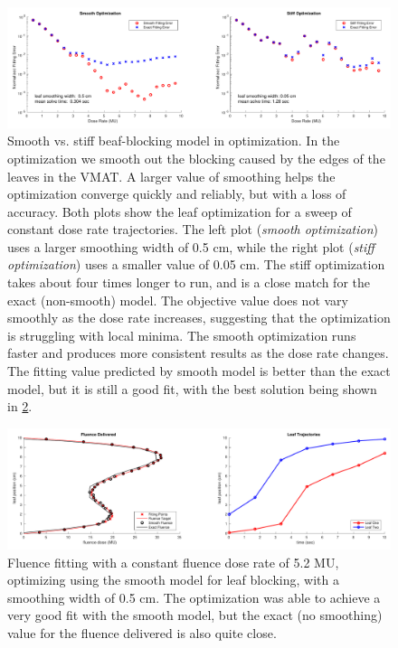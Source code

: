 \begin{figure}
  \centering
  \includegraphics[width=\textwidth]{fig/smoothVsStiffOptimization.pdf}
  \caption{Smooth vs. stiff beaf-blocking model in optimization.
      In the optimization we smooth out the blocking caused by the edges of the leaves in the VMAT.
      A larger value of smoothing helps the optimization converge quickly and reliably, but with a
      loss of accuracy. Both plots show the leaf optimization for a sweep of constant dose rate
      trajectories. The left plot (\textit{smooth optimization}) uses a larger smoothing width of 0.5 cm,
      while the right plot (\textit{stiff optimization}) uses a smaller value of 0.05 cm.
      The stiff optimization takes about four times longer to run, and is a close match for the
      exact (non-smooth) model. The objective value does not vary smoothly as the dose rate
      increases, suggesting that the optimization is struggling with local minima.
      The smooth optimization runs faster and produces more consistent results as the dose rate changes.
      The fitting value predicted by smooth model is better than the exact model, but it is still
      a good fit, with the best solution being shown in \ref{fig:fluenceMapSmoothingExample}.
  }
  \label{fig:smoothVsStiffOptimization}
\end{figure}




\begin{figure}
  \centering
  \includegraphics[width=\textwidth]{fig/fluenceMapSmoothingExample.pdf}
  \caption{Fluence fitting with a constant fluence dose rate of 5.2 MU,
      optimizing using the smooth model for leaf blocking, with a smoothing width of 0.5 cm.
      The optimization was able to achieve a very good fit with the smooth model, but the
      exact (no smoothing) value for the fluence delivered is also quite close.}
  \label{fig:fluenceMapSmoothingExample}
\end{figure}


